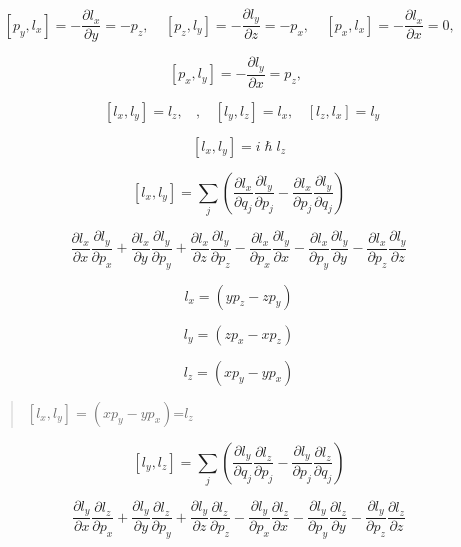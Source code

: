 \documentclass[]{article}
\begin{document}
\[\left\lbrack p_{y},l_{x} \right\rbrack = - \frac{\partial l_{x}}{\partial y} = - p_{z},\ \ \ \ \ \left\lbrack p_{z},l_{y} \right\rbrack = - \frac{\partial l_{y}}{\partial z} = - p_{x},\ \ \ \ \ \left\lbrack p_{x},l_{x} \right\rbrack = - \frac{\partial l_{x}}{\partial x} = 0,\ \ \ \ \ \ \]

\[\left\lbrack p_{x},l_{y} \right\rbrack = - \frac{\partial l_{y}}{\partial x} = p_{z},\ \ \]

\[\ \ \left\lbrack l_{x},l_{y} \right\rbrack = l_{z},\ \ \ \ ,\ \ \ \ \left\lbrack l_{y},l_{z} \right\rbrack = l_{x},\ \ \ \ \left\lbrack l_{z},l_{x} \right\rbrack = l_{y}\]

\[\left\lbrack l_{x},l_{y} \right\rbrack = i\mathbf{\hslash}l_{z}\]

\[\left\lbrack l_{x},l_{y} \right\rbrack = \sum_{j}^{}\left( \frac{\partial l_{x}}{\partial q_{j}}\frac{\partial l_{y}}{\partial p_{j}} - \frac{\partial l_{x}}{\partial p_{j}}\frac{\partial l_{y}}{\partial q_{j}} \right)\]

\[\frac{\partial l_{x}}{\partial x}\frac{\partial l_{y}}{\partial p_{x}} + \frac{\partial l_{x}}{\partial y}\frac{\partial l_{y}}{\partial p_{y}} + \frac{\partial l_{x}}{\partial z}\frac{\partial l_{y}}{\partial p_{z}} - \frac{\partial l_{x}}{\partial p_{x}}\frac{\partial l_{y}}{\partial x} - \frac{\partial l_{x}}{\partial p_{y}}\frac{\partial l_{y}}{\partial y} - \frac{\partial l_{x}}{\partial p_{z}}\frac{\partial l_{y}}{\partial z}\]

\[l_{x} = \left( yp_{z} - zp_{y} \right)\]

\[l_{y} = \left( zp_{x} - xp_{z} \right)\]

\[l_{z} = \left( xp_{y} - yp_{x} \right)\]

\begin{quote}
\(\left\lbrack l_{x},l_{y} \right\rbrack = \left( xp_{y} - yp_{x} \right)\)=\(l_{z}\)
\end{quote}

\[\left\lbrack l_{y},l_{z} \right\rbrack = \sum_{j}^{}\left( \frac{\partial l_{y}}{\partial q_{j}}\frac{\partial l_{z}}{\partial p_{j}} - \frac{\partial l_{y}}{\partial p_{j}}\frac{\partial l_{z}}{\partial q_{j}} \right)\]

\[\frac{\partial l_{y}}{\partial x}\frac{\partial l_{z}}{\partial p_{x}} + \frac{\partial l_{y}}{\partial y}\frac{\partial l_{z}}{\partial p_{y}} + \frac{\partial l_{y}}{\partial z}\frac{\partial l_{z}}{\partial p_{z}} - \frac{\partial l_{y}}{\partial p_{x}}\frac{\partial l_{z}}{\partial x} - \frac{\partial l_{y}}{\partial p_{y}}\frac{\partial l_{z}}{\partial y} - \frac{\partial l_{y}}{\partial p_{z}}\frac{\partial l_{z}}{\partial z}\]
\end{document}
